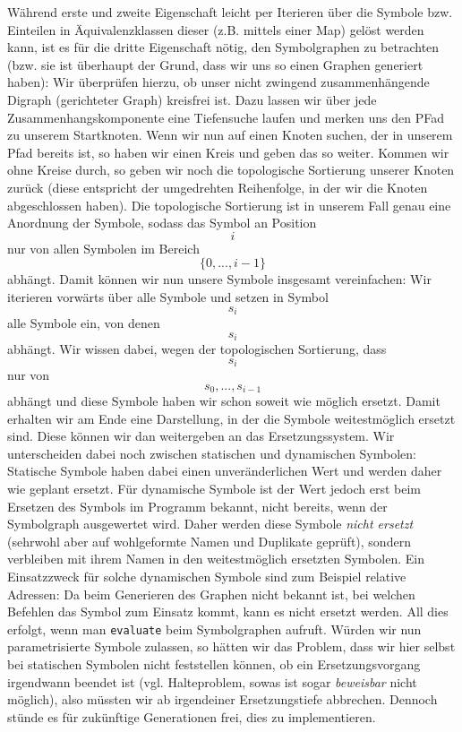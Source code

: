 Während erste und zweite Eigenschaft leicht per Iterieren über die Symbole bzw.
Einteilen in Äquivalenzklassen dieser (z.B. mittels einer Map) gelöst werden
kann, ist es für die dritte Eigenschaft nötig, den Symbolgraphen zu betrachten
(bzw. sie ist überhaupt der Grund, dass wir uns so einen Graphen generiert
haben): Wir überprüfen hierzu, ob unser nicht zwingend zusammenhängende Digraph
(gerichteter Graph) kreisfrei ist. Dazu lassen wir über jede
Zusammenhangskomponente eine Tiefensuche laufen und merken uns den PFad zu
unserem Startknoten. Wenn wir nun auf einen Knoten suchen, der in unserem Pfad
bereits ist, so haben wir einen Kreis und geben das so weiter. Kommen wir ohne
Kreise durch, so geben wir noch die topologische Sortierung unserer Knoten
zurück (diese entspricht der umgedrehten Reihenfolge, in der wir die Knoten
abgeschlossen haben). Die topologische Sortierung ist in unserem Fall genau eine
Anordnung der Symbole, sodass das Symbol an Position $$i$$ nur von allen
Symbolen im Bereich $$\{0,...,i-1\}$$ abhängt. Damit können wir nun unsere
Symbole insgesamt vereinfachen: Wir iterieren vorwärts über alle Symbole und
setzen in Symbol $$s_i$$ alle Symbole ein, von denen $$s_i$$ abhängt. Wir wissen
dabei, wegen der topologischen Sortierung, dass $$s_i$$ nur von
$$s_0,...,s_{i-1}$$ abhängt und diese Symbole haben wir schon soweit wie möglich
ersetzt. Damit erhalten wir am Ende eine Darstellung, in der die Symbole
weitestmöglich ersetzt sind. Diese können wir dan weitergeben an das
Ersetzungssystem. Wir unterscheiden dabei noch zwischen statischen und
dynamischen Symbolen: Statische Symbole haben dabei einen unveränderlichen Wert
und werden daher wie geplant ersetzt. Für dynamische Symbole ist der Wert jedoch
erst beim Ersetzen des Symbols im Programm bekannt, nicht bereits, wenn der
Symbolgraph ausgewertet wird. Daher werden diese Symbole \emph{nicht ersetzt}
(sehrwohl aber auf wohlgeformte Namen und Duplikate geprüft), sondern verbleiben
mit ihrem Namen in den weitestmöglich ersetzten Symbolen. Ein Einsatzzweck für
solche dynamischen Symbole sind zum Beispiel relative Adressen: Da beim
Generieren des Graphen nicht bekannt ist, bei welchen Befehlen das Symbol zum
Einsatz kommt, kann es nicht ersetzt werden. All dies erfolgt, wenn man
\texttt{evaluate} beim Symbolgraphen aufruft. Würden wir nun parametrisierte
Symbole zulassen, so hätten wir das Problem, dass wir hier selbst bei statischen
Symbolen nicht feststellen können, ob ein Ersetzungsvorgang irgendwann beendet
ist (vgl. Halteproblem, sowas ist sogar \emph{beweisbar} nicht möglich), also
müssten wir ab irgendeiner Ersetzungstiefe abbrechen. Dennoch stünde es für
zukünftige Generationen frei, dies zu implementieren.

